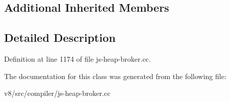 \subsection*{Additional Inherited Members}


\subsection{Detailed Description}


Definition at line 1174 of file js-\/heap-\/broker.\+cc.



The documentation for this class was generated from the following file\+:\begin{DoxyCompactItemize}
\item 
v8/src/compiler/js-\/heap-\/broker.\+cc\end{DoxyCompactItemize}
